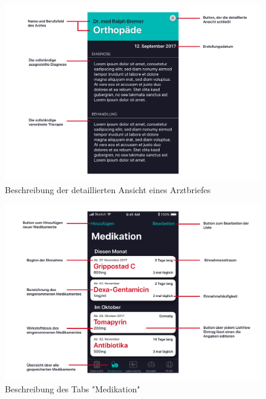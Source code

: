 \documentclass[a4paper]{scrreprt}
\begin{document}
\begin{figure}
\includegraphics[width=1\textwidth]{graphics/UIDescriptions/DetailedDLDesc}
\caption{Beschreibung der detaillierten Ansicht eines Arztbriefes}
\end{figure}

\begin{figure}
\includegraphics[width=1\textwidth]{graphics/UIDescriptions/MedicationsDesc}
\caption{Beschreibung des Tabs "Medikation"}
\end{figure}
\end{document}
